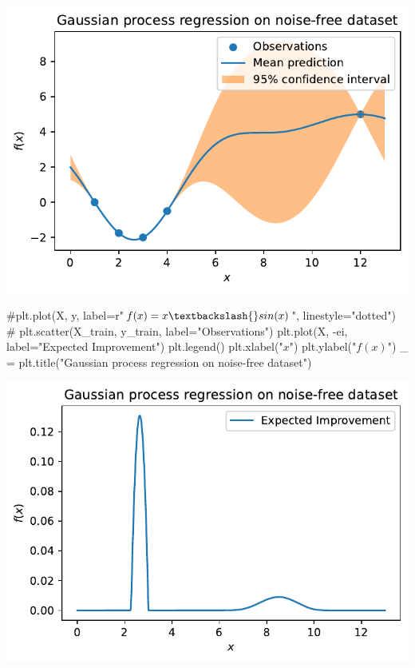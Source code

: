 \documentclass[
  letterpaper,
  DIV=11,
  numbers=noendperiod]{scrreprt}
\newenvironment{Shaded}{\begin{snugshade}}{\end{snugshade}}
\newcommand{\CommentTok}[1]{\textcolor[rgb]{0.37,0.37,0.37}{#1}}
\newcommand{\NormalTok}[1]{\textcolor[rgb]{0.00,0.23,0.31}{#1}}
\newcommand{\OperatorTok}[1]{\textcolor[rgb]{0.37,0.37,0.37}{#1}}
\newcommand{\StringTok}[1]{\textcolor[rgb]{0.13,0.47,0.30}{#1}}
\begin{document}
\includegraphics{012_num_spot_ei_files/figure-pdf/cell-44-output-1.pdf}

\begin{Shaded}
\begin{Highlighting}[]
\CommentTok{\#plt.plot(X, y, label=r"$f(x) = x \textbackslash{}sin(x)$", linestyle="dotted")}
\CommentTok{\# plt.scatter(X\_train, y\_train, label="Observations")}
\NormalTok{plt.plot(X, }\OperatorTok{{-}}\NormalTok{ei, label}\OperatorTok{=}\StringTok{"Expected Improvement"}\NormalTok{)}
\NormalTok{plt.legend()}
\NormalTok{plt.xlabel(}\StringTok{"$x$"}\NormalTok{)}
\NormalTok{plt.ylabel(}\StringTok{"$f(x)$"}\NormalTok{)}
\NormalTok{\_ }\OperatorTok{=}\NormalTok{ plt.title(}\StringTok{"Gaussian process regression on noise{-}free dataset"}\NormalTok{)}
\end{Highlighting}
\end{Shaded}

\includegraphics{012_num_spot_ei_files/figure-pdf/cell-45-output-1.pdf}
\end{document}
